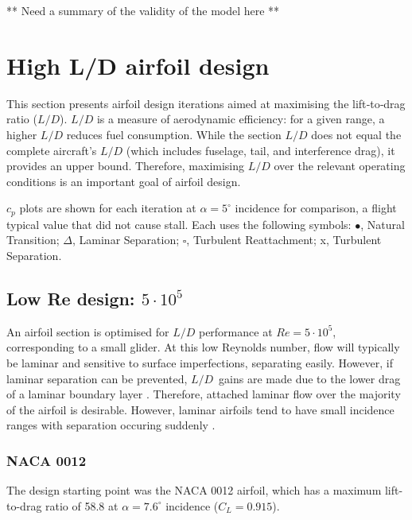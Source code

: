 \documentclass[a4paper,11pt]{article}
\begin{document}
** Need a summary of the validity of the model here **

\section{High L/D airfoil design} \label{sec:design}

This section presents airfoil design iterations aimed at maximising the lift‑to‑drag ratio (\(L/D\)). \(L/D\) is a measure of aerodynamic efficiency: for a given range, a higher \(L/D\) reduces fuel consumption. While the section \(L/D\) does not equal the complete aircraft’s \(L/D\) (which includes fuselage, tail, and interference drag), it provides an upper bound. Therefore, maximising \(L/D\) over the relevant operating conditions is an important goal of airfoil design.

$c_p$ plots are shown for each iteration at $\alpha=5^{\circ}$ incidence for comparison, a flight typical value that did not cause stall.
Each uses the following symbols: $\bullet$, Natural Transition; $\Delta$, Laminar Separation; $\square$, Turbulent Reattachment; x, Turbulent Separation.

\subsection{Low Re design: $5 \cdot 10^5$}

An airfoil section is optimised for \(L/D\) performance at $Re=5 \cdot 10^5$, corresponding to a small glider. At this low Reynolds number, flow will typically be laminar and sensitive to surface imperfections, separating easily. However, if laminar separation can be prevented, \(L/D\)\ gains are made due to the lower drag of a laminar boundary layer \cite{barnard2004aircraft}. Therefore, attached laminar flow over the majority of the airfoil is desirable. However, laminar airfoils tend to have small incidence ranges with separation occuring suddenly \cite{barnard2004aircraft}.


\subsubsection{NACA 0012}

The design starting point was the NACA 0012 airfoil, which has a maximum lift-to-drag ratio of 58.8 at $\alpha=7.6^{\circ}$ incidence ($C_L = 0.915$). 
\end{document}
